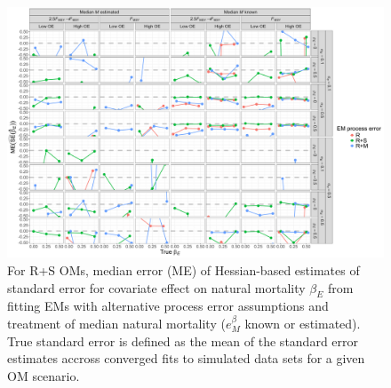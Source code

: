 \documentclass[
  12pt,
]{article}
\begin{document}
\begin{landscape}
\begin{figure}
\begin{center}
\includegraphics[height = \textheight]{se_beta_E_bias_RSom}
\end{center}
\caption{For R+S OMs, median error (ME) of Hessian-based estimates of standard error for covariate effect on natural mortality $\beta_E$ from fitting EMs with alternative process error assumptions and treatment of median natural mortality ($e^\beta_M$ known or estimated). True standard error is defined as the mean of the standard error estimates accross converged fits to simulated data sets for a given OM scenario.}\label{se_beta_E_bias_RSom}
\end{figure}
\end{landscape}
\end{document}
